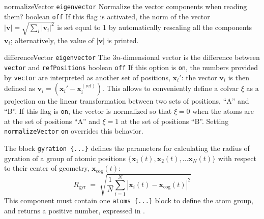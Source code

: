 \begin{cvcoptions}
\item %
  \keydef
    {normalizeVector}{%
    \texttt{eigenvector}}{%
    Normalize the vector components when reading them?}{%
    boolean}{%
    \texttt{off}}{%
    If this flag is activated, the norm of the vector $|\mathbf{v}| = \sqrt{\sum_{i} \left|\mathbf{v}_i\right|^2}$ is set equal to 1 by automatically rescaling all the components $\mathbf{v}_i$; alternatively, the value of $|\mathbf{v}|$ is printed.
  }

\item %
  \keydef
    {differenceVector}{%
    \texttt{eigenvector}}{%
    The $3n$-dimensional vector is the difference between \texttt{vector} and \texttt{refPositions}}{%
    boolean}{%
    \texttt{off}}{%
    If this option is \texttt{on}, the numbers provided by \texttt{vector} are interpreted as another set of positions, $\mathbf{x}_{i}'$: the vector $\mathbf{v}_{i}$ is then defined as $\mathbf{v}_{i} = \left(\mathbf{x}_{i}' - \mathbf{x}_{i}^{\mathrm{(ref)}}\right)$.
This allows to conveniently define a colvar $\xi$ as a projection on the linear transformation between two sets of positions, ``A'' and ``B''.
If this flag is \texttt{on}, the vector is normalized so that $\xi = 0$ when the atoms are at the set of positions ``A'' and $\xi = 1$ at the set of positions ``B''. Setting \texttt{normalizeVector} \texttt{on} overrides this behavior.
}
\end{cvcoptions}



The block \texttt{gyration~\{...\}} defines the
parameters for calculating the radius of gyration of a group of atomic
positions $\{ \mathbf{x}_1(t), \mathbf{x}_2(t), \ldots \mathbf{x}_N(t)
\}$ with respect to their center of geometry,
$\mathbf{x}_{\mathrm{cog}}(t)$:
\begin{equation}
  \label{eq:colvar_gyration}
  R_{\mathrm{gyr}} \; = \; \sqrt{ \frac{1}{N}
    \sum_{i=1}^{N} \left|\mathbf{x}_{i}(t) -
      \mathbf{x}_{\mathrm{cog}}(t)\right|^{2} }
\end{equation}
This component must contain one \texttt{atoms~\{...\}} block to
define the atom group, and returns a positive number, expressed in
\lengthunit.

\begin{cvcoptions}
\item %
\end{cvcoptions}


